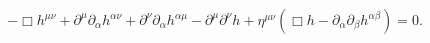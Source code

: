 \begin{equation}
- \Box h^{\mu\nu} + \partial^\mu \partial_\alpha  h^{\alpha \nu} + \partial^\nu\partial_\alpha  h^{\alpha \mu}
 - \partial^\mu \partial^\nu h + \eta^{\mu\nu}(\Box h -\partial_\alpha \partial_\beta h^{\alpha \beta}) = 0.
\label{46}
\end{equation}

